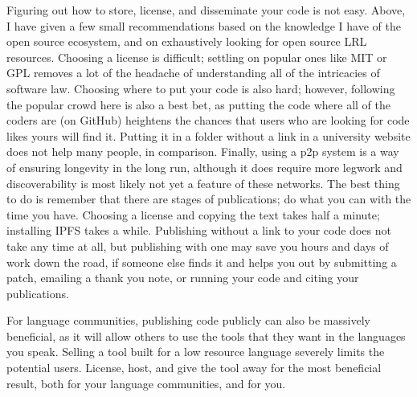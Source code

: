 Figuring out how to store, license, and disseminate your code is not easy. Above, I have given a few small recommendations based on the knowledge I have of the open source ecosystem, and on exhaustively looking for open source LRL resources. Choosing a license is difficult; settling on popular ones like MIT or GPL removes a lot of the headache of understanding all of the intricacies of software law. Choosing where to put your code is also hard; however, following the popular crowd here is also a best bet, as putting the code where all of the coders are (on GitHub) heightens the chances that users who are looking for code likes yours will find it. Putting it in a folder without a link in a university website does not help many people, in comparison. Finally, using a p2p system is a way of ensuring longevity in the long run, although it does require more legwork and discoverability is most likely not yet a feature of these networks. The best thing to do is remember that there are stages of publications; do what you can with the time you have. Choosing a license and copying the text takes half a minute; installing IPFS takes a while. Publishing without a link to your code does not take any time at all, but publishing with one may save you hours and days of work down the road, if someone else finds it and helps you out by submitting a patch, emailing a thank you note, or running your code and citing your publications. 

For language communities, publishing code publicly can also be massively beneficial, as it will allow others to use the tools that they want in the languages you speak. Selling a tool built for a low resource language severely limits the potential users. License, host, and give the tool away for the most beneficial result, both for your language communities, and for you. 
